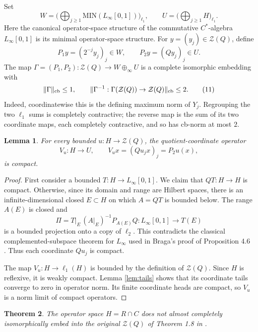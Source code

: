 \documentclass[11pt]{article}
\newtheorem{theorem}{Theorem}
\newtheorem{lemma}[theorem]{Lemma}
\newcommand{\MIN}{\mathrm{MIN}}
\newcommand{\cZ}{\mathcal Z}
\begin{document}
Set
\[
 W=\Big(\bigoplus_{j\geq1}\MIN(L_\infty[0,1])\Big)_{\ell_1},
 \qquad
 U=\Big(\bigoplus_{j\geq1}H\Big)_{\ell_1}.
\]
Here the canonical operator-space structure of the commutative
$C^*$-algebra $L_\infty[0,1]$ is its minimal operator-space structure.
For $y=(y_j)\in\cZ(Q)$, define
\[
 P_1y=(2^{-j}y_j)_j\in W,
 \qquad
 P_2y=(Qy_j)_j\in U.
\]
The map $\Gamma=(P_1,P_2):\cZ(Q)\to W\oplus_\infty U$ is a complete
isomorphic embedding with
\[
 \|\Gamma\|_{\rm cb}\leq1,
 \qquad
 \|\Gamma^{-1}:\Gamma(\cZ(Q))\to\cZ(Q)\|_{\rm cb}\leq2.
 \tag{11}\label{eq:gamma}
\]
Indeed, coordinatewise this is the defining maximum norm of $Y_j$.
Regrouping the two $\ell_1$ sums is completely contractive; the reverse map
is the sum of its two coordinate maps, each completely contractive, and so
has cb-norm at most $2$.

\begin{lemma}\label{lem:quotcompact}
For every bounded $u:H\to\cZ(Q)$, the quotient-coordinate operator
\[
 V_u:H\to U,\qquad V_ux=(Qu_jx)_j=P_2u(x),
\]
is compact.
\end{lemma}

\begin{proof}
First consider a bounded $T:H\to L_\infty[0,1]$.  We claim that $QT:H\to H$
is compact.  Otherwise, since its domain and range are Hilbert spaces, there
is an infinite-dimensional closed $E\subset H$ on which $A=QT$ is bounded
below.  The range $A(E)$ is closed and
\[
 \Pi=T|_E\,(A|_E)^{-1}P_{A(E)}Q:L_\infty[0,1]\to T(E)
\]
is a bounded projection onto a copy of $\ell_2$.  This contradicts the
classical complemented-subspace theorem for $L_\infty$ used in Braga's proof
of Proposition 4.6 \cite{Braga2021,AlbiacKalton}.  Thus each coordinate
$Qu_j$ is compact.

The map $V_u:H\to\ell_1(H)$ is bounded by the definition of $\cZ(Q)$.  Since
$H$ is reflexive, it is weakly compact.  Lemma \ref{lem:tails} shows that its
coordinate tails converge to zero in operator norm.  Its finite coordinate
heads are compact, so $V_u$ is a norm limit of compact operators.
\end{proof}

\begin{theorem}\label{thm:originalH}
The operator space $H=R\cap C$ does not almost completely isomorphically
embed into the original $\cZ(Q)$ of Theorem 1.8 in \cite{Braga2021}.
\end{theorem}
\end{document}
